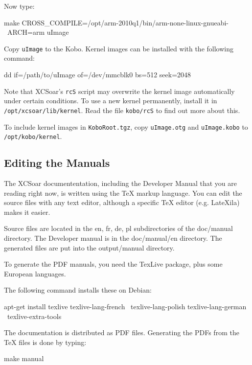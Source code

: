 Now type:

\begin{verbatim*}
make CROSS_COMPILE=/opt/arm-2010q1/bin/arm-none-linux-gnueabi- \
  ARCH=arm uImage
\end{verbatim*}

Copy \texttt{uImage} to the Kobo.  Kernel images can be installed with
the following command:

\begin{verbatim*}
dd if=/path/to/uImage of=/dev/mmcblk0 bs=512 seek=2048
\end{verbatim*}

Note that XCSoar's \texttt{rcS} script may overwrite the kernel image
automatically under certain conditions.  To use a new kernel
permanently, install it in \texttt{/opt/xcsoar/lib/kernel}.  Read the
file \texttt{kobo/rcS} to find out more about this.

To include kernel images in \texttt{KoboRoot.tgz}, copy
\texttt{uImage.otg} and \texttt{uImage.kobo} to
\texttt{/opt/kobo/kernel}.

\subsection{Editing the Manuals}

The XCSoar documententation, including the Developer Manual that you are 
reading right now, is written using the TeX markup language. You can edit
the source files with any text editor, although a specific TeX editor (e.g. LateXila) 
makes it easier. 

Source files are located in the en, fr, de, pl subdirectories of the doc/manual directory. 
The Developer manual is in the doc/manual/en directory. The generated files are put into
the output/manual directory.

To generate the PDF manuals, you need the TexLive package, plus some European languages.

The following command installs these on Debian:

\begin{verbatim*}
apt-get install texlive texlive-lang-french \
  texlive-lang-polish texlive-lang-german \
  texlive-extra-tools
\end{verbatim*}

The documentation is distributed as PDF files. Generating the PDFs from the 
TeX files is done by typing:

\begin{verbatim*}
make manual
\end{verbatim*}

